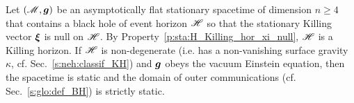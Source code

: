 \begin{prop}
\label{p:sta:staticity_thm}
Let $(\mathscr{M},\bm{g})$ be an asymptotically flat stationary spacetime of dimension $n\geq 4$
that contains a black hole of event horizon $\mathscr{H}$ so that
the stationary Killing vector $\bm{\xi}$ is null on $\mathscr{H}$. By Property~\ref{p:sta:H_Killing_hor_xi_null}, $\mathscr{H}$ is a Killing horizon. If $\mathscr{H}$ is
non-degenerate (i.e. has a non-vanishing surface gravity $\kappa$, cf. Sec.~\ref{s:neh:classif_KH})
and $\bm{g}$ obeys the vacuum Einstein equation, then the spacetime
is static and the domain of outer communications (cf. Sec.~\ref{s:glo:def_BH}) is strictly static.
\end{prop}

